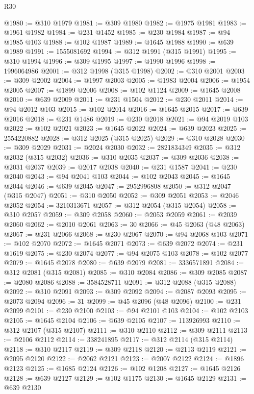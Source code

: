 \begin{lexlean}{R30}
\begin{coremodule}
@1980 := @310 @1979
@1981 := @309 @1980
@1982 := @1975 @1981
@1983 := @1961 @1982
@1984 := @231 @1452
@1985 := @230 @1984
@1987 := @94 @1985 @103
@1988 := @102 @1987
@1989 := @1645 @1988
@1990 := @639 @1989
@1991 := 1555081692
@1994 := @312 @1991 (@315 @1991)
@1995 := @310 @1994
@1996 := @309 @1995
@1997 := @1990 @1996
@1998 := 1996064986
@2001 := @312 @1998 (@315 @1998)
@2002 := @310 @2001
@2003 := @309 @2002
@2004 := @1997 @2003
@2005 := @1983 @2004
@2006 := @1954 @2005
@2007 := @1899 @2006
@2008 := @102 @1124
@2009 := @1645 @2008
@2010 := @639 @2009
@2011 := @231 @1504
@2012 := @230 @2011
@2014 := @94 @2012 @103
@2015 := @102 @2014
@2016 := @1645 @2015
@2017 := @639 @2016
@2018 := @231 @1486
@2019 := @230 @2018
@2021 := @94 @2019 @103
@2022 := @102 @2021
@2023 := @1645 @2022
@2024 := @639 @2023
@2025 := 2554220882
@2028 := @312 @2025 (@315 @2025)
@2029 := @310 @2028
@2030 := @309 @2029
@2031 := @2024 @2030
@2032 := 2821834349
@2035 := @312 @2032 (@315 @2032)
@2036 := @310 @2035
@2037 := @309 @2036
@2038 := @2031 @2037
@2039 := @2017 @2038
@2040 := @231 @1587
@2041 := @230 @2040
@2043 := @94 @2041 @103
@2044 := @102 @2043
@2045 := @1645 @2044
@2046 := @639 @2045
@2047 := 2952996808
@2050 := @312 @2047 (@315 @2047)
@2051 := @310 @2050
@2052 := @309 @2051
@2053 := @2046 @2052
@2054 := 3210313671
@2057 := @312 @2054 (@315 @2054)
@2058 := @310 @2057
@2059 := @309 @2058
@2060 := @2053 @2059
@2061 := @2039 @2060
@2062 := @2010 @2061
@2063 := 30
@2066 := @45 @2063 (@48 @2063)
@2067 := @231 @2066
@2068 := @230 @2067
@2070 := @94 @2068 @103
@2071 := @102 @2070
@2072 := @1645 @2071
@2073 := @639 @2072
@2074 := @231 @1619
@2075 := @230 @2074
@2077 := @94 @2075 @103
@2078 := @102 @2077
@2079 := @1645 @2078
@2080 := @639 @2079
@2081 := 3336571891
@2084 := @312 @2081 (@315 @2081)
@2085 := @310 @2084
@2086 := @309 @2085
@2087 := @2080 @2086
@2088 := 3584528711
@2091 := @312 @2088 (@315 @2088)
@2092 := @310 @2091
@2093 := @309 @2092
@2094 := @2087 @2093
@2095 := @2073 @2094
@2096 := 31
@2099 := @45 @2096 (@48 @2096)
@2100 := @231 @2099
@2101 := @230 @2100
@2103 := @94 @2101 @103
@2104 := @102 @2103
@2105 := @1645 @2104
@2106 := @639 @2105
@2107 := 113926993
@2110 := @312 @2107 (@315 @2107)
@2111 := @310 @2110
@2112 := @309 @2111
@2113 := @2106 @2112
@2114 := 338241895
@2117 := @312 @2114 (@315 @2114)
@2118 := @310 @2117
@2119 := @309 @2118
@2120 := @2113 @2119
@2121 := @2095 @2120
@2122 := @2062 @2121
@2123 := @2007 @2122
@2124 := @1896 @2123
@2125 := @1685 @2124
@2126 := @102 @1208
@2127 := @1645 @2126
@2128 := @639 @2127
@2129 := @102 @1175
@2130 := @1645 @2129
@2131 := @639 @2130

\end{coremodule}
\end{lexlean}
